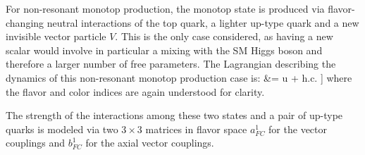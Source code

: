 For non-resonant monotop production, the monotop state is produced via
flavor-changing neutral interactions of the top quark, a lighter up-type
quark and a new invisible vector particle $V$. 
This is the only case considered, as having a new scalar 
would involve in particular a mixing with the SM Higgs boson and therefore a larger number of free parameters. 
The Lagrangian describing the
dynamics of this non-resonant monotop production case is:
\be\label{eq:lagrangianNonResonantVector}\bsp
\lag &=
\bigg[
V_\mu \bar u \gmu \Big[a^1_{FC} \!+\! b^1_{FC} \gamma_5 \Big] u  
%
+ \rm h.c. 
\bigg] 
\esp\ee
where the flavor and color indices are
again understood for clarity.

The strength of the interactions among these two states and a pair
of up-type quarks is modeled via two $3\times 3$ matrices in flavor space $a^{1}_{FC}$ for the vector couplings
and $b^{1}_{FC}$ for the axial vector couplings.

